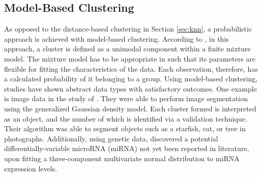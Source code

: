 \subsection{Model-Based Clustering}
\label{sec:modelbasedclustering}
As opposed to the distance-based clustering in Section \ref{sec:knn}, a probabilistic approach is achieved with model-based clustering. According to , in this approach, a cluster is defined as a unimodal component within a finite mixture model. The mixture model has to be appropriate in such that its parameters are flexible for fitting the characteristics of the data. Each observation, therefore, has a calculated probability of it belonging to a group. Using model-based clustering, studies have shown abstract data types with satisfactory outcomes. One example is image data in the study of \cite{Choy2017}. They were able to perform image segmentation using the generalized Gaussian density model. Each cluster formed is interpreted as an object, and the number of which is identified via a validation technique. Their algorithm was able to segment objects such as a starfish, cat, or tree in photographs. Additionally, using genetic data,  discovered a potential differentially-variable microRNA (miRNA) not yet been reported in literature, upon fitting a three-component multivariate normal distribution to miRNA expression levels.


